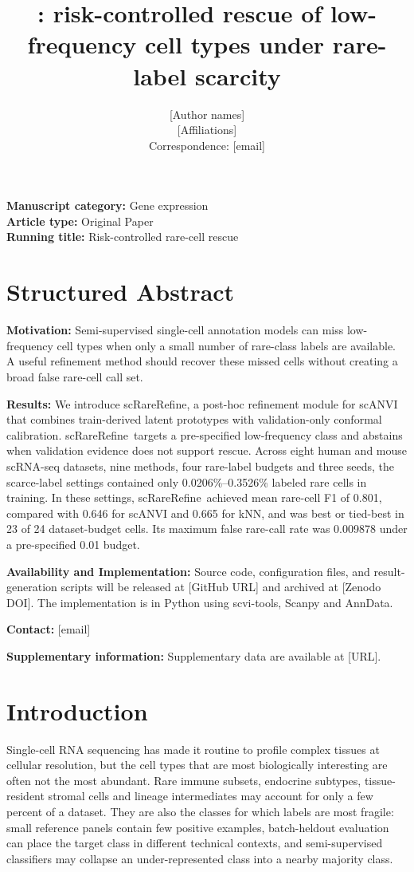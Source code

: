 \documentclass[11pt]{article}
\title{\bfseries \method: risk-controlled rescue of low-frequency cell types under rare-label scarcity}
\author{[Author names]\\[2pt]
\small [Affiliations]\\
\small Correspondence: [email]}
\date{}
\newcommand{\method}{scRareRefine}
\begin{document}
\maketitle

\noindent\textbf{Manuscript category:} Gene expression \\
\textbf{Article type:} Original Paper \\
\textbf{Running title:} Risk-controlled rare-cell rescue

\section*{Structured Abstract}

\noindent\textbf{Motivation:}
Semi-supervised single-cell annotation models can miss low-frequency cell
types when only a small number of rare-class labels are available. A useful
refinement method should recover these missed cells without creating a broad
false rare-cell call set.

\noindent\textbf{Results:}
We introduce \method, a post-hoc refinement module for scANVI that combines
train-derived latent prototypes with validation-only conformal calibration.
\method\ targets a pre-specified low-frequency class and abstains when
validation evidence does not support rescue. Across eight human and mouse
scRNA-seq datasets, nine methods, four rare-label budgets and three seeds, the
scarce-label settings contained only 0.0206\%--0.3526\% labeled rare cells in
training. In these settings, \method\ achieved mean rare-cell F1 of 0.801,
compared with 0.646 for scANVI and 0.665 for kNN, and was best or tied-best in
23 of 24 dataset-budget cells. Its maximum false rare-call rate was 0.009878
under a pre-specified 0.01 budget.

\noindent\textbf{Availability and Implementation:}
Source code, configuration files, and result-generation scripts will be
released at [GitHub URL] and archived at [Zenodo DOI]. The implementation is in
Python using scvi-tools, Scanpy and AnnData.

\noindent\textbf{Contact:} [email]

\noindent\textbf{Supplementary information:}
Supplementary data are available at [URL].

\section{Introduction}

Single-cell RNA sequencing has made it routine to profile complex tissues at
cellular resolution, but the cell types that are most biologically interesting
are often not the most abundant. Rare immune subsets, endocrine subtypes,
tissue-resident stromal cells and lineage intermediates may account for only a
few percent of a dataset. They are also the classes for which labels are most
fragile: small reference panels contain few positive examples, batch-heldout
evaluation can place the target class in different technical contexts, and
semi-supervised classifiers may collapse an under-represented class into a
nearby majority class.
\end{document}
